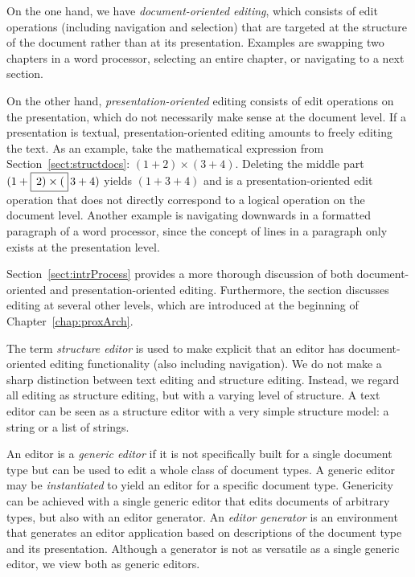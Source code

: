 
On the one hand, we have {\em document-oriented editing}, which consists of edit operations (including navigation and selection) that are targeted at the structure of the document rather than at its presentation. Examples are swapping two chapters in a word processor, selecting an entire chapter, or navigating to a next section.

On the other hand, {\em presentation-oriented} editing consists of edit operations on the presentation, which do not necessarily make sense at the document level. If a presentation is textual,  presentation-oriented editing amounts to freely editing the text. As an example, take the mathematical expression from Section~\ref{sect:structdocs}: 
$(1+2) \times (3+4)$. Deleting the middle part $(1+\framebox{$\,2) \times ($}\,3+4)$ yields $(1+3+4)$ and is a presentation-oriented edit operation that does not directly correspond to a logical operation on the document level. Another example is navigating downwards in a formatted paragraph of a word processor, since the concept of lines in a paragraph only exists at the presentation level. 

Section~\ref{sect:intrProcess} provides a more thorough discussion of both document-oriented and presentation-oriented editing. Furthermore, the section discusses editing at several other levels, which are introduced at the beginning of Chapter~\ref{chap:proxArch}.


The term {\em structure editor} is used to make explicit that an editor has document-oriented editing functionality (also including navigation). We do not make a sharp distinction between text editing and structure editing. Instead, we regard all editing as structure editing, but with a varying level of structure. A text editor can be seen as a structure editor with a very simple structure model: a string or a list of strings. 

An editor is a {\em generic editor} if it is not specifically built for a single document type but can be used to edit a whole class of document types. A generic editor may be {\em instantiated} to yield an editor for a specific document type. Genericity can be achieved with a single generic editor that edits documents of arbitrary types, but also with an editor generator. An {\em editor generator} is an environment that generates an editor application based on descriptions of the document type and its presentation. Although a generator is not as versatile as a single generic editor, we view both as generic editors. 

